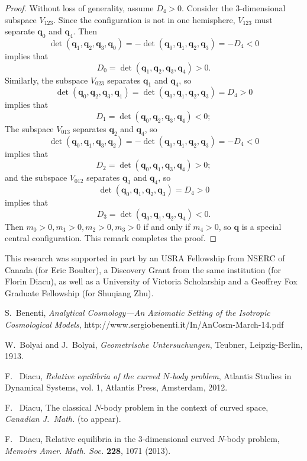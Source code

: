 \documentclass[12pt]{amsart}
\theoremstyle{definition}
\newcommand {\q} {\mathbf{q}}
\begin{document}
{\begin{proof}
Without loss of generality, assume $D_4>0$. Consider the 3-dimensional subspace $V_{123}$. Since the configuration is not in one hemisphere, $V_{123}$ must separate $\q_0$ and $\q_4$. Then 
$$
\det(\q_1, \q_2, \q_3, \q_0)=-\det(\q_0, \q_1, \q_2, \q_3)=-D_4<0
$$
implies that 
$$
D_0=\det(\q_1, \q_2, \q_3, \q_4)>0.
$$
Similarly, the subspace $V_{023}$ separates $\q_1$ and $\q_4$, so 
$$
\det(\q_0, \q_2, \q_3, \q_1)=\det(\q_0, \q_1, \q_2, \q_3)=D_4>0
$$
implies that
$$
D_1=\det(\q_0, \q_2, \q_3, \q_4)<0;
$$
The subspace $V_{013}$ separates $\q_2$ and $\q_4$, so 
$$
\det(\q_0, \q_1, \q_3, \q_2)=-\det(\q_0, \q_1, \q_2, \q_3)=-D_4<0
$$
implies that
$$
D_2=\det(\q_0, \q_1, \q_3, \q_4)>0;
$$
and the subspace $V_{012}$ separates $\q_3$ and $\q_4$, so 
$$
\det(\q_0, \q_1, \q_2, \q_3)=D_4>0
$$
implies that
$$
D_3=\det(\q_0, \q_1, \q_2, \q_4)<0.
$$
Then $m_0>0, m_1>0, m_2>0, m_3>0$ if and only if $m_4>0$, so $\q$ is a special central configuration. This remark completes the proof.
\end{proof}

\bigskip

 This research was supported in part by an USRA Fellowship from NSERC of Canada (for Eric Boulter), a Discovery Grant from the same institution (for Florin Diacu), as well as a University of Victoria Scholarship and a Geoffrey Fox Graduate Fellowship (for Shuqiang Zhu).



\begin{thebibliography}{99}

 S.~Benenti, \emph{Analytical Cosmology---An Axiomatic Setting of the Isotropic Cosmological Models}, http://www.sergiobenenti.it/In/AnCosm-March-14.pdf

 W.~Bolyai and J.~Bolyai, {\it Geometrische Untersuchungen}, Teubner, Leipzig-Berlin, 1913.

 F. \ Diacu, {\it Relative equilibria of the curved $N$-body problem}, Atlantis Studies in Dynamical Systems, vol. 1, Atlantis Press, Amsterdam, 2012.

 F. \ Diacu, The classical $N$-body problem in the context of curved space, {\it Canadian J.\ Math.} (to appear).

 F. \ Diacu, Relative equilibria in the 3-dimensional curved $N$-body problem, {\it Memoirs Amer. Math. Soc.} {\bf 228}, 1071 (2013).


\end{thebibliography}}
\end{document}
